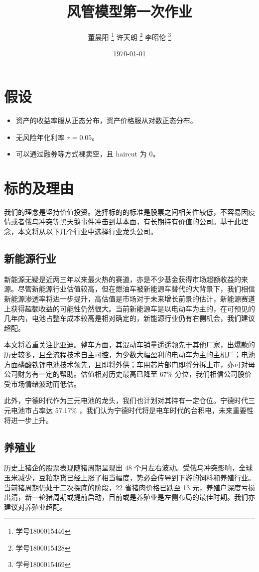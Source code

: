 \documentclass[a4paper,12pt]{ctexart}
\author{董晨阳 \thanks{学号1800015446} 许天朗 \thanks{学号1800015428} 李昭伦 \thanks{学号1800015469}}
\date{\today}
\title{风管模型第一次作业}
\begin{document}
\maketitle
\section{假设}
\label{sec:orgef30c16}
\begin{itemize}
\item 资产的收益率服从正态分布，资产价格服从对数正态分布。
\item 无风险年化利率 \(r=0.05\)。
\item 可以通过融券等方式裸卖空，且 haircut 为 0。
\end{itemize}
\section{标的及理由}
\label{sec:org4fadadd}
我们的理念是坚持价值投资。选择标的的标准是股票之间相关性较低，不容易因疫情或者俄乌冲突等黑天鹅事件冲击到基本面，有长期持有价值的公司。基于此理念，本文将从以下几个行业中选择行业龙头公司。
\subsection{新能源行业}
\label{sec:org6091fb3}
新能源无疑是近两三年以来最火热的赛道，亦是不少基金获得市场超额收益的来源。尽管新能源行业估值较高，但在燃油车被新能源车替代的大背景下，我们相信新能源渗透率将进一步提升，高估值是市场对于未来增长前景的估计，新能源赛道上获得超额收益的可能性仍然很大。当前新能源车是以电动车为主的，在可预见的几年内，电池占整车成本较高是相对确定的，新能源行业仍有右侧机会，我们建议超配。

本文将着重关注比亚迪。整车方面，其混动车销量遥遥领先于其他厂家，出爆款的历史较多，且全流程技术自主可控，为少数大幅盈利的电动车为主的主机厂；电池方面磷酸铁锂电池技术领先，且即将外供；车用芯片部门即将分拆上市，亦可对母公司财务有一定的帮助。估值相对历史最高已降至 67\% 分位，我们相信公司股价受市场情绪波动而低估。

此外，宁德时代作为三元电池的龙头，我们也计划对其持有一定仓位。宁德时代三元电池市占率达 57.17\% ，我们认为宁德时代将是电车时代的台积电，未来重要性将进一步上升。
\subsection{养殖业}
\label{sec:orgf891dbf}
历史上猪企的股票表现随猪周期呈现出 48 个月左右波动。受俄乌冲突影响，全球玉米减少，豆粕期货已经上涨了相当幅度，势必会传导到下游的饲料和养殖行业。当前猪周期仍处于二次探底的阶段，22 省猪肉价格已跌至 13 元，养殖户深度亏损出清，新一轮猪周期或提前启动，目前或是养殖业是左侧布局的最佳时期。我们亦建议对养殖业超配。
\end{document}
